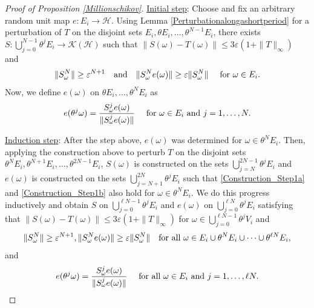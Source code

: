 \documentclass[pdflatex,sn-mathphys-num]{sn-jnl}%
\theoremstyle{thmstyleone}%
\theoremstyle{thmstyletwo}%
\theoremstyle{thmstylethree}%
\newcommand{\cH}{\mathcal{H}}
\newcommand{\eps}{\varepsilon}
\numberwithin{equation}{section}
\begin{document}
\begin{proof}[Proof of Proposition \ref{Millionschikov}]
\noindent 
\underline{Initial step}: Choose and fix an arbitrary random unit map $e:E_i\rightarrow \cH$. Using Lemma \ref{Perturbationalongashortperiod} for a perturbation of $T$ on the disjoint sets $E_i,\theta E_i,\dots,\theta^{N-1}E_i$, there exists $S:\bigcup_{j=0}^{N-1} \theta^j E_i\rightarrow \mathcal K(\cH)$ such that $\|S(\omega)-T(\omega)\|\leq 3\eps (1+\|T\|_{\infty})$ and 
\begin{equation}\label{Construction_Step1a}
\|S_{\omega}^N\|\geq \eps^{N+1}\quad\hbox{and}\quad  \|S_{\omega}^Ne(\omega)\|\geq \eps \|S_{\omega}^N\|\quad \hbox{ for } \omega \in E_i.
\end{equation}
Now, we define $e(\omega)$ on $\theta E_i,\dots,\theta^N E_i$ as 
\begin{equation}\label{Construction_Step1b}
e(\theta^{j}\omega)=\frac{S^{j}_{\omega}e(\omega)}{\|S^j_{\omega}e(\omega)\|}\quad \hbox{ for } \omega \in E_i \hbox{ and } j=1,\dots, N.
\end{equation}

\noindent 
\underline{Induction step}: After the step above, $e(\omega)$ was determined for $\omega\in \theta^N E_i$. Then, applying the construction above to perturb $T$ on the disjoint sets $\theta^{N}E_i,\theta^{N+1}E_i,\dots,\theta^{2N-1}E_i$, $S(\omega)$ is constructed on the sets $\bigcup_{j=N}^{2N-1}\theta^j E_i$ and $e(\omega)$ is constructed on the sets   $\bigcup_{j=N+1}^{2N}\theta^j E_i$ such that \eqref{Construction_Step1a} and \eqref{Construction_Step1b} also hold for $\omega\in \theta^N E_i$. We do this progress inductively and obtain $S$ on $\bigcup_{j=0}^{\ell N-1} \theta^j E_i$ and $e(\omega)$ on $\bigcup_{j=0}^{\ell N} \theta^j E_i$ satisfying that $\|S(\omega)-T(\omega)\|\leq 3\eps(1+ \|T\|_{\infty})$ for  $\omega\in \bigcup_{j=0}^{\ell N-1}\theta^j V_i$ and 
\begin{equation}
\|S_{\omega}^N\|\geq \eps^{N+1}, \|S_{\omega}^Ne(\omega)\|
\geq  \eps \|S_{\omega}^N\|\quad \hbox{for all } \omega \in E_i\cup \theta^N E_i\cup\dots\cup\theta^{\ell N} E_i\label{Nstepnorm},
\end{equation}
and
\begin{equation}\label{Invariance_InductionStep}
e(\theta^j\omega)
=
\frac{S^{j}_{\omega}e(\omega)}{\|S^j_{\omega}e(\omega)\|}\quad \hbox{ for all } \omega \in E_i \hbox{ and } j=1,\dots, \ell N.
\end{equation} 


\end{proof}
\end{document}
